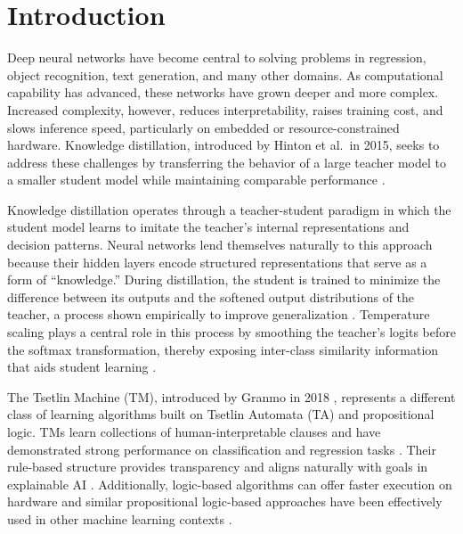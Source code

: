 \documentclass[sn-mathphys-num]{sn-jnl}%
\theoremstyle{thmstyleone}%
\theoremstyle{thmstyletwo}%
\theoremstyle{thmstylethree}%
\begin{document}
\section{Introduction}\label{sec1}
Deep neural networks have become central to solving problems in regression, object recognition, text generation, and many other domains. As computational capability has advanced, these networks have grown deeper and more complex. Increased complexity, however, reduces interpretability, raises training cost, and slows inference speed, particularly on embedded or resource-constrained hardware. Knowledge distillation, introduced by Hinton et al.\ in 2015, seeks to address these challenges by transferring the behavior of a large teacher model to a smaller student model while maintaining comparable performance \cite{hinton2015distillingknowledgeneuralnetwork}.

Knowledge distillation operates through a teacher-student paradigm in which the student model learns to imitate the teacher's internal representations and decision patterns. Neural networks lend themselves naturally to this approach because their hidden layers encode structured representations that serve as a form of ``knowledge.'' During distillation, the student is trained to minimize the difference between its outputs and the softened output distributions of the teacher, a process shown empirically to improve generalization \cite{deepseekai2025deepseekr1incentivizingreasoningcapability}. Temperature scaling plays a central role in this process by smoothing the teacher's logits before the softmax transformation, thereby exposing inter-class similarity information that aids student learning \cite{hinton2015distillingknowledgeneuralnetwork, matsuyama2025adaptive}.

The Tsetlin Machine (TM), introduced by Granmo in 2018 \cite{granmo2018tsetlin}, represents a different class of learning algorithms built on Tsetlin Automata (TA) and propositional logic. TMs learn collections of human-interpretable clauses and have demonstrated strong performance on classification and regression tasks \cite{abeyrathna2021massively, lei2020arithmetic}. Their rule-based structure provides transparency and aligns naturally with goals in explainable AI \cite{xu2019explainable, dovsilovic2018explainable}. Additionally, logic-based algorithms can offer faster execution on hardware and similar propositional logic-based approaches have been effectively used in other machine learning contexts \cite{anjum2022localization, anjumlocalization}.
\end{document}

